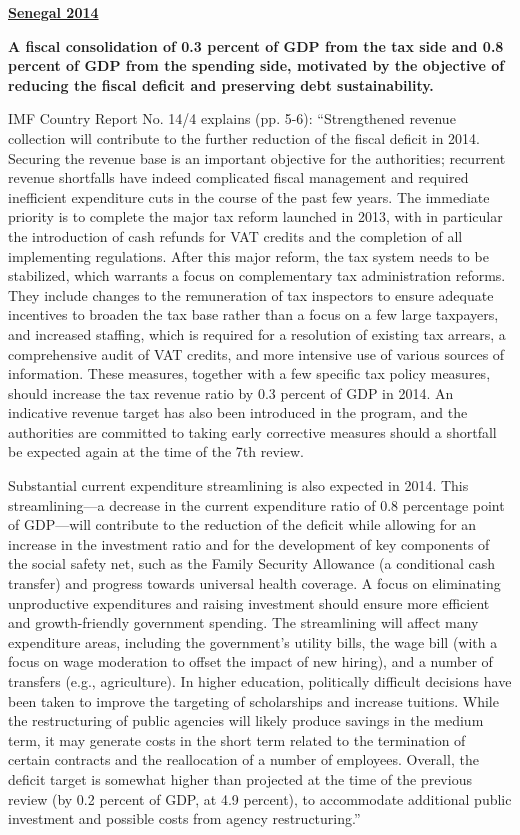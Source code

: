 \textbf{\underline{Senegal 2014}}

\textbf{A fiscal consolidation of 0.3 percent of GDP from the tax side and 0.8 percent of GDP from the spending side, motivated by the objective of reducing the fiscal deficit and preserving debt sustainability.}

IMF Country Report No. 14/4 explains (pp. 5-6): “Strengthened revenue collection will contribute to the further reduction of the fiscal deficit in 2014. Securing the revenue base is an important objective for the authorities; recurrent revenue shortfalls have indeed complicated fiscal management and required inefficient expenditure cuts in the course of the past few years. The immediate priority is to complete the major tax reform launched in 2013, with in particular the introduction of cash refunds for VAT credits and the completion of all implementing regulations. After this major reform, the tax system needs to be stabilized, which warrants a focus on complementary tax administration reforms. They include changes to the remuneration of tax inspectors to ensure adequate incentives to broaden the tax base rather than a focus on a few large taxpayers, and increased staffing, which is required for a resolution of existing tax arrears, a comprehensive audit of VAT credits, and more intensive use of various sources of information. These measures, together with a few specific tax policy measures, should increase the tax revenue ratio by 0.3 percent of GDP in 2014. An indicative revenue target has also been introduced in the program, and the authorities are committed to taking early corrective measures should a shortfall be expected again at the time of the 7th review.

Substantial current expenditure streamlining is also expected in 2014. This streamlining—a decrease in the current expenditure ratio of 0.8 percentage point of GDP—will contribute to the reduction of the deficit while allowing for an increase in the investment ratio and for the development of key components of the social safety net, such as the Family Security Allowance (a conditional cash transfer) and progress towards universal health coverage. A focus on eliminating unproductive expenditures and raising investment should ensure more efficient and growth-friendly government spending. The streamlining will affect many expenditure areas, including the government’s utility bills, the wage bill (with a focus on wage moderation to offset the impact of new hiring), and a number of transfers (e.g., agriculture). In higher education, politically difficult decisions have been taken to improve the targeting of scholarships and increase tuitions. While the restructuring of public agencies will likely produce savings in the medium term, it may generate costs in the short term related to the termination of certain contracts and the reallocation of a number of employees. Overall, the deficit target is somewhat higher than projected at the time of the previous review (by 0.2 percent of GDP, at 4.9 percent), to accommodate additional public investment and possible costs from agency restructuring.”

